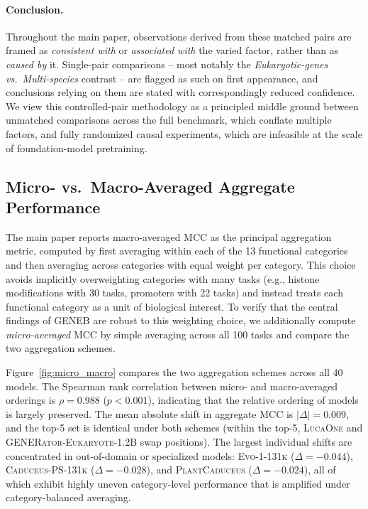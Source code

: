 \documentclass{article}
\theoremstyle{plain}
\theoremstyle{definition}
\theoremstyle{remark}
\begin{document}
\paragraph{Conclusion.}
Throughout the main paper, observations derived from these matched pairs
are framed as \emph{consistent with} or \emph{associated with} the
varied factor, rather than as \emph{caused by} it. Single-pair
comparisons -- most notably the \emph{Eukaryotic-genes vs.\ Multi-species}
contrast -- are flagged as such on first appearance, and conclusions
relying on them are stated with correspondingly reduced confidence. We
view this controlled-pair methodology as a principled middle ground
between unmatched comparisons across the full benchmark, which conflate
multiple factors, and fully randomized causal experiments, which are
infeasible at the scale of foundation-model pretraining.

\subsection{Micro- vs.\ Macro-Averaged Aggregate Performance}
\label{subsec:macro_micro}

The main paper reports macro-averaged MCC as the principal aggregation
metric, computed by first averaging within each of the 13 functional
categories and then averaging across categories with equal weight per
category. This choice avoids implicitly overweighting categories with
many tasks (e.g., histone modifications with 30 tasks, promoters with
22 tasks) and instead treats each functional category as a unit of
biological interest. To verify that the central findings of GENEB are
robust to this weighting choice, we additionally compute
\emph{micro-averaged} MCC by simple averaging across all 100 tasks and
compare the two aggregation schemes.

Figure~\ref{fig:micro_macro} compares the two aggregation schemes
across all 40 models. The Spearman rank correlation between micro-
and macro-averaged orderings is $\rho = 0.988$ ($p < 0.001$),
indicating that the relative ordering of models is largely preserved.
The mean absolute shift in aggregate MCC is $|\Delta| = 0.009$, and
the top-5 set is identical under both schemes (within the top-5,
\textsc{LucaOne} and \textsc{GENERator-Eukaryote-1.2B} swap positions).
The largest individual shifts are concentrated in out-of-domain or
specialized models: \textsc{Evo-1-131k} ($\Delta = -0.044$),
\textsc{Caduceus-PS-131k} ($\Delta = -0.028$), and
\textsc{PlantCaduceus} ($\Delta = -0.024$), all of which exhibit
highly uneven category-level performance that is amplified under
category-balanced averaging.
\end{document}
